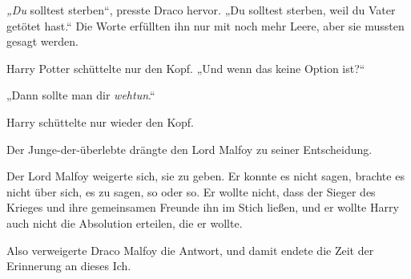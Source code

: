 \emph{„Du} solltest sterben“, presste Draco hervor.
„Du solltest sterben, weil du Vater getötet hast.“ Die Worte erfüllten ihn nur mit noch mehr Leere, aber sie mussten gesagt werden.

Harry Potter schüttelte nur den Kopf.
„Und wenn das keine Option ist?“

„Dann sollte man dir \emph{wehtun}.“

Harry schüttelte nur wieder den Kopf.

Der Junge-der-überlebte drängte den Lord Malfoy zu seiner Entscheidung.

Der Lord Malfoy weigerte sich, sie zu geben. Er konnte es nicht sagen, brachte es nicht über sich, es zu sagen, so oder so. Er wollte nicht, dass der Sieger des Krieges und ihre gemeinsamen Freunde ihn im Stich ließen, und er wollte Harry auch nicht die Absolution erteilen, die er wollte.

Also verweigerte Draco Malfoy die Antwort, und damit endete die Zeit der Erinnerung an dieses Ich.

\later


